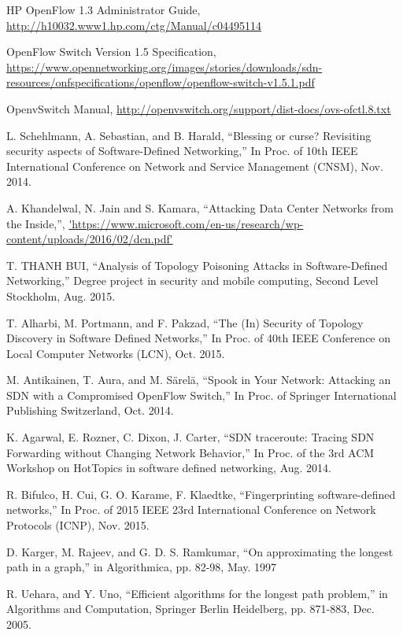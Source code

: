 \begin{thebibliography}{1}
HP OpenFlow 1.3 Administrator Guide, \url{http://h10032.www1.hp.com/ctg/Manual/c04495114}

OpenFlow Switch Version 1.5 Specification, \url{https://www.opennetworking.org/images/stories/downloads/sdn-resources/onfspecifications/openflow/openflow-switch-v1.5.1.pdf}

OpenvSwitch Manual, \url{http://openvswitch.org/support/dist-docs/ovs-ofctl.8.txt}

L. Schehlmann, A. Sebastian, and B. Harald, 
``Blessing or curse? Revisiting security aspects of Software-Defined Networking,'' In Proc. of 10th IEEE International Conference on Network and Service Management (CNSM), Nov. 2014.

A. Khandelwal, N. Jain and S. Kamara,
``Attacking Data Center Networks from the Inside,'', \url{'https://www.microsoft.com/en-us/research/wp-content/uploads/2016/02/dcn.pdf'} 

T. THANH BUI,
``Analysis of Topology Poisoning Attacks in Software-Defined Networking,'' Degree project in security and mobile computing, Second Level Stockholm, Aug. 2015.

T. Alharbi, M. Portmann, and F. Pakzad,
``The (In) Security of Topology Discovery in Software Defined Networks,'' In Proc. of 40th IEEE Conference on Local Computer Networks (LCN), Oct. 2015.

M. Antikainen, T. Aura, and M. Särelä,
``Spook in Your Network: Attacking an SDN with a Compromised OpenFlow Switch,'' In Proc. of Springer International Publishing Switzerland, Oct. 2014.

K. Agarwal, E. Rozner, C. Dixon, J. Carter,
``SDN traceroute: Tracing SDN Forwarding without Changing Network Behavior,'' In Proc. of the 3rd ACM Workshop on HotTopics in software defined networking, Aug. 2014.

R. Bifulco, H. Cui, G. O. Karame, F. Klaedtke,
``Fingerprinting software-defined networks,'' In Proc. of 2015 IEEE 23rd International Conference on Network Protocols (ICNP), Nov. 2015.

D. Karger, M. Rajeev, and G. D. S. Ramkumar,
``On approximating the longest path in a graph,'' in Algorithmica, pp. 82-98, May. 1997

R. Uehara, and Y. Uno,
``Efficient algorithms for the longest path problem,'' in Algorithms and Computation, Springer Berlin Heidelberg, pp. 871-883, Dec. 2005.



\end{thebibliography}
